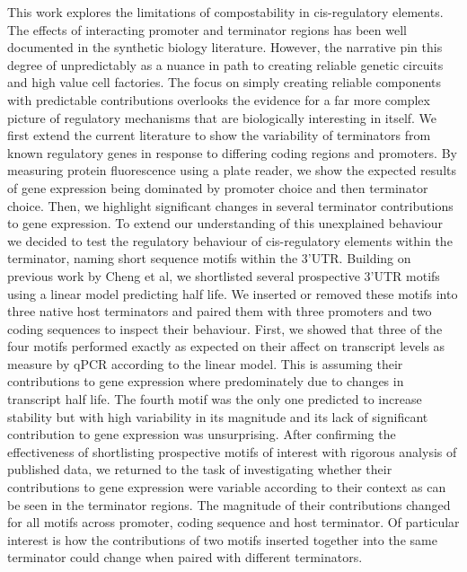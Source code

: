 \documentclass{SBCbookchapter}
\begin{document}
This work explores the limitations of compostability in cis-regulatory elements. The effects of interacting promoter and terminator regions has been well documented in the synthetic biology literature. However, the narrative pin this degree of unpredictably as a nuance in path to creating reliable genetic circuits and high value cell factories. The focus on simply creating reliable components with predictable contributions overlooks the evidence for a far more complex picture of regulatory mechanisms that are biologically interesting in itself. We first extend the current literature to show the variability of terminators from known regulatory genes in response to differing coding regions and promoters. By measuring protein fluorescence using a plate reader, we show the expected results of gene expression being dominated by promoter choice and then terminator choice. Then, we highlight significant changes in several terminator contributions to gene expression. To extend our understanding of this unexplained behaviour we decided to test the regulatory behaviour of cis-regulatory elements within the terminator, naming short sequence motifs within the 3'UTR. Building on previous work by Cheng et al, we shortlisted several prospective 3'UTR motifs using a linear model predicting half life. We inserted or removed these motifs into three native host terminators and paired them with three promoters and two coding sequences to inspect their behaviour. First, we showed that three of the four motifs performed exactly as expected on their affect on transcript levels as measure by qPCR according to the linear model. This is assuming their contributions to gene expression where predominately due to changes in transcript half life. The fourth motif was the only one predicted to increase stability but with high variability in its magnitude and its lack of significant contribution to gene expression was unsurprising. After confirming the effectiveness of shortlisting prospective motifs of interest with rigorous analysis of published data, we returned to the task of investigating whether their contributions to gene expression were variable according to their context as can be seen in the terminator regions. The magnitude of their contributions changed for all motifs across promoter, coding sequence and host terminator. Of particular interest is how the contributions of two motifs inserted together into the same terminator could change when paired with different terminators.
\end{document}
